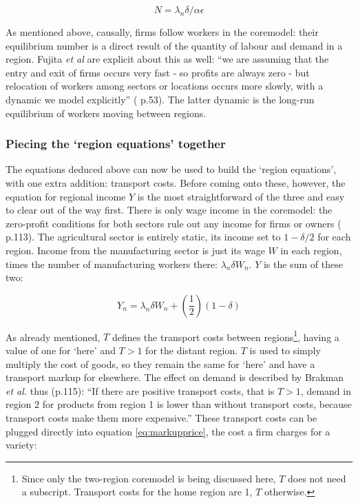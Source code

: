 {\begin{itemize}
\end{itemize}

\begin{equation}
N = \lambda_{n} \delta / \alpha \epsilon\label{eq:eqfirmnumber} 
\end{equation}

As mentioned above, causally, firms follow workers in the \gls{coremodel}: their equilibrium number is a direct result of the quantity of labour and demand in a region. Fujita \emph{et al} are explicit about this as well: ``we are assuming that the entry and exit of firms occurs very fast - so profits are always zero - but relocation of workers among sectors or locations occurs more slowly, with a dynamic we model explicitly'' (\citealt{fujita_spatial_2001} p.53). The latter dynamic is the long-run equilibrium of workers moving between regions. 

\subsubsection{Piecing the `region equations' together}

The equations deduced above can now be used to build the `region equations', with one extra addition: transport costs. Before coming onto these, however, the equation for regional income $Y$ is the most straightforward of the three and easy to clear out of the way first. There is only wage income in the \gls{coremodel}: the zero-profit conditions for both sectors rule out any income for firms or owners (\citealt{brakman_new_2009} p.113). The agricultural sector is entirely static, its income set to $1-\delta/2$ for each region. Income from the manufacturing sector is just its wage $W$ in each region, times the number of manufacturing workers there: $\lambda_{n} \delta W_{n}$. $Y$ is the sum of these two: 

\begin{equation}
Y_{n}=\lambda_{n}\delta W_{n}+(\frac{1}{2})(1-\delta)\label{eq:regionincome}
\end{equation}

As already mentioned, $T$ defines the transport costs between regions\footnote{Since only the two-region \gls{coremodel} is being discussed here, $T$ does not need a subscript. Transport costs for the home region are 1, $T$ otherwise.}, having a value of one for `here' and $T>1$ for the distant region. $T$ is used to simply multiply the cost of goods, so they remain the same for `here' and have a transport markup for elsewhere. The effect on demand is described by Brakman \emph{et al.} thus (p.115): ``If there are positive transport costs, that is $T>1$, demand in region 2 for products from region 1 is lower than without transport costs, because transport costs make them more expensive.'' These transport costs can be plugged directly into equation \eqref{eq:markupprice}, the cost a firm charges for a variety: 

}
